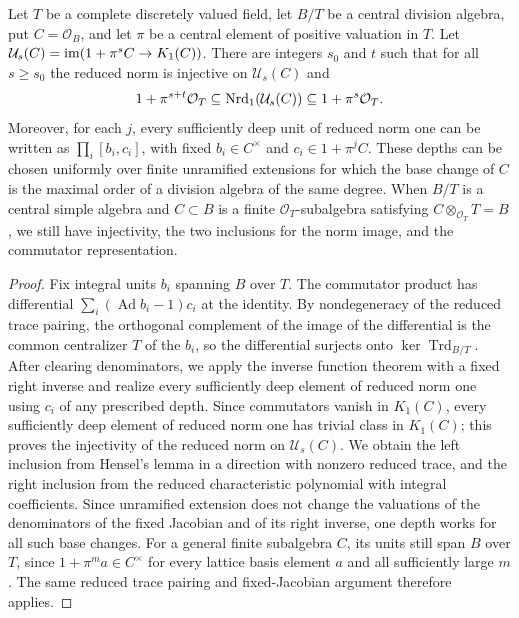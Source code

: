 \begin{lemma}\label{lem:app-deep-unit-norm}
Let $T$ be a complete discretely valued field, let $B/T$ be a central division algebra, put $C=\mathcal O_B$, and let $\pi$ be a central element of positive valuation in $T$.
Let $\mathcal U_s(C)=\operatorname{im}(1+\pi^sC\to K_1(C))$.
There are integers $s_0$ and $t$ such that for all $s\ge s_0$ the reduced norm is injective on $\mathcal U_s(C)$ and
\[
 1+\pi^{s+t}\mathcal O_T\subseteq\operatorname{Nrd}_1(\mathcal U_s(C))
       \subseteq1+\pi^s\mathcal O_T.
\]
Moreover, for each $j$, every sufficiently deep unit of reduced norm one can be written as $\prod_i[b_i,c_i]$, with fixed $b_i\in C^\times$ and $c_i\in1+\pi^jC$.
These depths can be chosen uniformly over finite unramified extensions for which the base change of $C$ is the maximal order of a division algebra of the same degree.
When $B/T$ is a central simple algebra and $C\subset B$ is a finite $\mathcal O_T$-subalgebra satisfying $C\otimes_{\mathcal O_T}T=B$, we still have injectivity, the two inclusions for the norm image, and the commutator representation.
\end{lemma}
\begin{proof}
Fix integral units $b_i$ spanning $B$ over $T$.
The commutator product has differential $\sum_i(\operatorname{Ad}b_i-1)c_i$ at the identity.
By nondegeneracy of the reduced trace pairing, the orthogonal complement of the image of the differential is the common centralizer $T$ of the $b_i$, so the differential surjects onto $\ker\operatorname{Trd}_{B/T}$.
After clearing denominators, we apply the inverse function theorem with a fixed right inverse and realize every sufficiently deep element of reduced norm one using $c_i$ of any prescribed depth.
Since commutators vanish in $K_1(C)$, every sufficiently deep element of reduced norm one has trivial class in $K_1(C)$; this proves the injectivity of the reduced norm on $\mathcal U_s(C)$.
We obtain the left inclusion from Hensel's lemma in a direction with nonzero reduced trace, and the right inclusion from the reduced characteristic polynomial with integral coefficients.
Since unramified extension does not change the valuations of the denominators of the fixed Jacobian and of its right inverse, one depth works for all such base changes.
For a general finite subalgebra $C$, its units still span $B$ over $T$, since $1+\pi^ma\in C^\times$ for every lattice basis element $a$ and all sufficiently large $m$.
The same reduced trace pairing and fixed-Jacobian argument therefore applies.
\end{proof}

